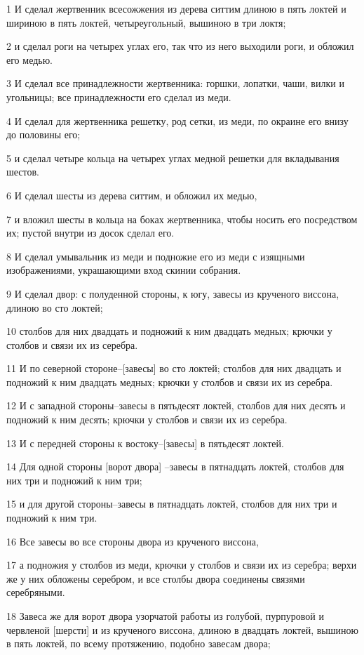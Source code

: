 \par 1 И сделал жертвенник всесожжения из дерева ситтим длиною в пять локтей и шириною в пять локтей, четыреугольный, вышиною в три локтя;
\par 2 и сделал роги на четырех углах его, так что из него выходили роги, и обложил его медью.
\par 3 И сделал все принадлежности жертвенника: горшки, лопатки, чаши, вилки и угольницы; все принадлежности его сделал из меди.
\par 4 И сделал для жертвенника решетку, род сетки, из меди, по окраине его внизу до половины его;
\par 5 и сделал четыре кольца на четырех углах медной решетки для вкладывания шестов.
\par 6 И сделал шесты из дерева ситтим, и обложил их медью,
\par 7 и вложил шесты в кольца на боках жертвенника, чтобы носить его посредством их; пустой внутри из досок сделал его.
\par 8 И сделал умывальник из меди и подножие его из меди с изящными изображениями, украшающими вход скинии собрания.
\par 9 И сделал двор: с полуденной стороны, к югу, завесы из крученого виссона, длиною во сто локтей;
\par 10 столбов для них двадцать и подножий к ним двадцать медных; крючки у столбов и связи их из серебра.
\par 11 И по северной стороне--[завесы] во сто локтей; столбов для них двадцать и подножий к ним двадцать медных; крючки у столбов и связи их из серебра.
\par 12 И с западной стороны--завесы в пятьдесят локтей, столбов для них десять и подножий к ним десять; крючки у столбов и связи их из серебра.
\par 13 И с передней стороны к востоку--[завесы] в пятьдесят локтей.
\par 14 Для одной стороны [ворот двора] --завесы в пятнадцать локтей, столбов для них три и подножий к ним три;
\par 15 и для другой стороны--завесы в пятнадцать локтей, столбов для них три и подножий к ним три.
\par 16 Все завесы во все стороны двора из крученого виссона,
\par 17 а подножия у столбов из меди, крючки у столбов и связи их из серебра; верхи же у них обложены серебром, и все столбы двора соединены связями серебряными.
\par 18 Завеса же для ворот двора узорчатой работы из голубой, пурпуровой и червленой [шерсти] и из крученого виссона, длиною в двадцать локтей, вышиною в пять локтей, по всему протяжению, подобно завесам двора;
